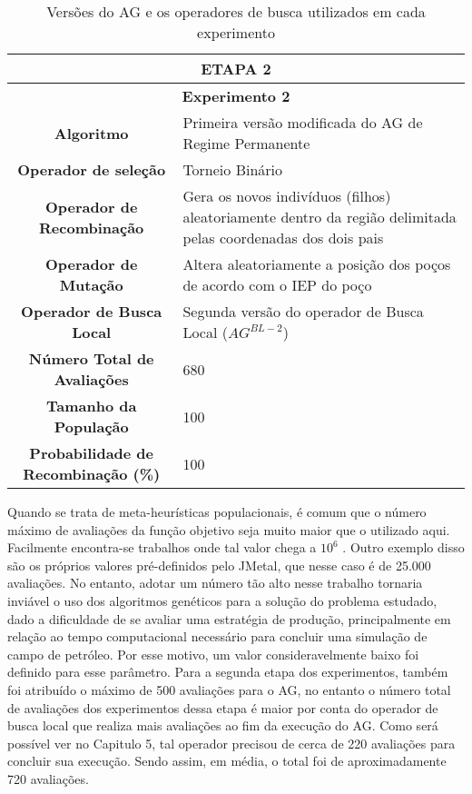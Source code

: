  \begin{table}[H]
\centering
\caption{Versões do AG e os operadores de busca utilizados em cada experimento}
\begin{tabular}{|c|p{9cm}|}
 \hline
 \multicolumn{2}{|c|}{ETAPA 2} \\ \hline
 \multicolumn{2}{|c|}{\textbf{Experimento 2}} \\ \hline
 \textbf{Algoritmo} & Primeira versão modificada do AG de Regime Permanente \\ \hline
 \textbf{Operador de seleção} & Torneio Binário \\ \hline
 \textbf{Operador de Recombinação} & Gera os novos indivíduos (filhos) aleatoriamente dentro da região delimitada pelas coordenadas dos dois pais \\  \hline
 \textbf{Operador de Mutação} & Altera aleatoriamente a posição dos poços de acordo com o IEP do poço \\ \hline
 \textbf{Operador de Busca Local} & Segunda versão do operador de Busca Local ($AG^{BL-2}$) \\ \hline
 \textbf{Número Total de Avaliações} & 680 \\ \hline
 \textbf{Tamanho da População} & 100 \\ \hline
 \textbf{Probabilidade de Recombinação (\%)} & 100 \\ \hline
\end{tabular}
\end{table}

Quando se trata de meta-heurísticas populacionais, é comum que o número máximo de avaliações da função objetivo seja muito maior que o utilizado aqui. Facilmente encontra-se trabalhos onde tal valor chega a $10^6$ \cite{Elsayed2016,Tangherloni2017,Kumar2017,Zamuda2017}. Outro exemplo disso são os próprios valores pré-definidos pelo JMetal, que nesse caso é de 25.000 avaliações. No entanto, adotar um número tão alto nesse trabalho tornaria inviável o uso dos algoritmos genéticos para a solução do problema estudado, dado a dificuldade de se avaliar uma estratégia de produção, principalmente em relação ao tempo computacional necessário para concluir uma simulação de campo de petróleo. Por esse motivo, um valor consideravelmente baixo foi definido para esse parâmetro. Para a segunda etapa dos experimentos, também foi atribuído o máximo de 500 avaliações para o AG, no entanto o número total de avaliações dos experimentos dessa etapa é maior por conta do operador de busca local que realiza mais avaliações ao fim da execução do AG. Como será possível ver no Capitulo 5, tal operador precisou de cerca de 220 avaliações para concluir sua execução. Sendo assim, em média, o total foi de aproximadamente 720 avaliações.

